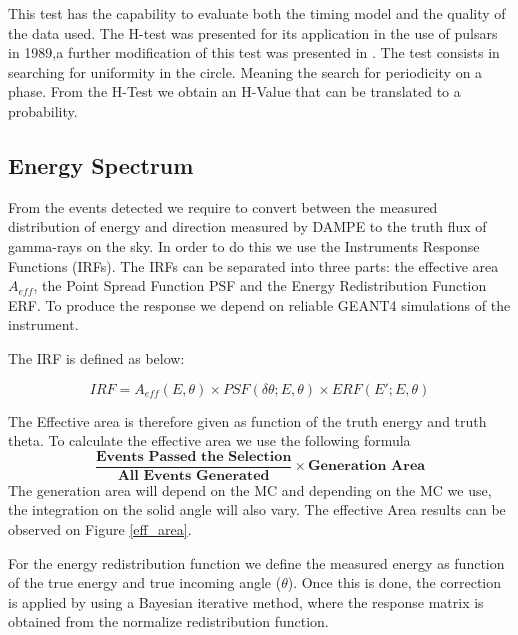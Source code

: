 \documentclass{PoS}
\begin{document}
This test has the capability to evaluate both the timing model and the quality of the data used.  The H-test was presented for its application in the use of pulsars in 1989,a further  modification of this test was presented in \cite{h-test}.
The test consists in searching for uniformity in the circle.  Meaning the search for  periodicity on  a phase. From the H-Test we obtain an H-Value that can be translated to a probability.






\subsection{Energy Spectrum}
From the  events detected we require to convert between the measured distribution of energy and direction measured by DAMPE to the truth flux of gamma-rays on the sky. In order to do this we use the Instruments Response Functions (IRFs). The IRFs  can be  separated into three parts: the effective area $A_{eff}$, the Point Spread Function PSF and the Energy Redistribution Function ERF. To produce the response we depend on reliable GEANT4 simulations of the instrument.

The IRF is defined as below:

\begin{equation}
IRF=A_{eff}(E,\theta)\times{PSF}(\delta\theta;E,\theta)\times ERF (E';E,\theta)
\end{equation}

The Effective area is therefore given as function of the truth energy and truth theta. To calculate the effective area we use the following formula
\begin{equation}
\frac{\textbf{Events Passed the Selection}}{\textbf{All Events Generated}}\times {\textbf{Generation Area}}
\end{equation}
The generation area will depend on the  MC and depending on the MC we use, the integration on the solid angle will also vary. The effective Area results can be observed on Figure \ref{eff_area}.

For the energy redistribution function we define the measured energy as function of the true energy and true incoming angle ($\theta$). Once this is done, the correction is applied by using a Bayesian iterative method, where the response matrix is obtained from the normalize redistribution function.
\end{document}
